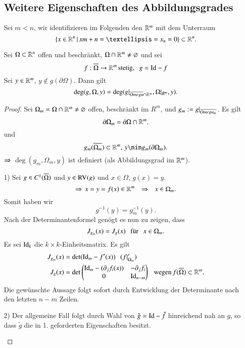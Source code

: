\subsection{Weitere Eigenschaften des Abbildungsgrades}

Sei $m<n$, wir identifizieren im Folgenden den $\mathbb{R}^m$ mit dem Unterraum
\[
    \{x\in \R^n \, | \, x{m+n}=…=x_n=0\}\subset \R^n.
\]

\begin{theorem}\label{2.14}
    Sei $\Omega \subset \mathbb{R}^n$ offen und beschränkt, $\Omega \cap \mathbb{R}^m \neq \varnothing$ und sei
    \[
        f:\overline \Omega \rightarrow \mathbb{R}^m\, \text{stetig,} \hspace{.25cm} g=\mathrm{Id}-f
    \]
    Sei $y\in \mathbb{R}^m$, $y\nin g(\partial \Omega)$. Dann gilt
    \[
        \deg(g,\Omega,y)=\deg(g|_{\overline{Omega}\cap\mathbb{R}^m},\Omega|_{R^m},y).
    \]
\end{theorem}

\begin{proof}
    Sei $\Omega_m=\Omega\cap\mathbb{R}^m\neq \varnothing$ offen, beschränkt im $R^m$, und
    $g_m:=g|_{\overline{Omega_m}}$. Es gilt
    \[
        \partial \Omega_m=\partial\Omega\cap\mathbb{R}^m.
    \]
    und
    \[
        g_m(\ol{\Omega_m})\subset\R^m,\, y\nin g_m(\partial\Omega_m).
    \]
    $\Rightarrow$ $\deg(g_m,\Omega_m,y)$ ist definiert (als Abbildungsgrad im $\mathbb{R}^m$).
    \begin{description}
        \item{1)}
        Sei $g\in C^1(\overline \Omega)$ und $y\in \mathrm{RV}(g)$ und $x\in \Omega$, $g(x)=y$.
        \[
        \Rightarrow \, x=y=f(x)\in \mathbb{R}^m \hspace{.25cm} \Rightarrow \hspace{.25cm} x\in \Omega_m.
        \]
        Somit haben wir
        \[
            g^{-1}(y)=g_m^{-1}(y).
        \]
        Nach der Determinantenformel genögt es nun zu zeigen, dass
        \[
            J_{g_m}(x)=J_g(x) \hspace{.25cm} \text{für} \hspace{.25cm} x\in \Omega_m.
        \]
        Es sei $\mathrm{Id}_k$ die $k\times k$-Einheitsmatrix. Es gilt
        \begin{align*}
            J_{g_m}(x)&=\det(\mathrm{Id}_m-f'(x)) \hspace{.25cm} (f|_{\Omega_m}')\\
            J_g(x)&= \det\begin{pmatrix} \mathrm{Id}_m-(\partial_jf_i(x)) & -\partial_jf_i\\
            0& \mathrm{Id}_{n-m}\end{pmatrix} \hspace{.25cm} \text{wegen} \, f(\overline\Omega)\subset\mathbb{R}^m.
        \end{align*}
        Die gewünschte Aussage folgt sofort durch Entwicklung der Determinante nach den letzten
        $n-m$ Zeilen.
        \item{2)}
        Der allgemeine Fall folgt durch Wahl von $\tilde g=\mathrm{Id}-\tilde f$ hinreichend nah an $g$, so dass
        $\tilde g$ die in 1. geforderten Eigenschaften besitzt.
    \end{description}
    \[ \]
\end{proof}
